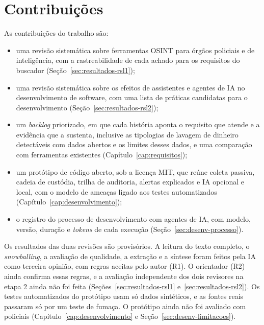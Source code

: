 \section{Contribuições}
\label{sec:intro-contribuicoes}

As contribuições do trabalho são:
\begin{itemize}
	\item uma revisão sistemática sobre ferramentas OSINT para órgãos policiais
	e de inteligência, com a rastreabilidade de cada achado para os requisitos
	do buscador (Seção~\ref{sec:resultados-rsl1});
	\item uma revisão sistemática sobre os efeitos de assistentes e agentes de
	IA no desenvolvimento de software, com uma lista de práticas candidatas
	para o desenvolvimento (Seção~\ref{sec:resultados-rsl2});
	\item um \textit{backlog} priorizado, em que cada história aponta o
	requisito que atende e a evidência que a sustenta, inclusive as
	tipologias de lavagem de dinheiro detectáveis com dados abertos e os
	limites desses dados, e uma comparação com ferramentas existentes
	(Capítulo~\ref{cap:requisitos});
	\item um protótipo de código aberto, sob a licença MIT, que reúne coleta
	passiva, cadeia de custódia, trilha de auditoria, alertas explicados e IA
	opcional e local, com o modelo de ameaças ligado aos testes automatizados
	(Capítulo~\ref{cap:desenvolvimento});
	\item o registro do processo de desenvolvimento com agentes de IA, com
	modelo, versão, duração e \textit{tokens} de cada execução
	(Seção~\ref{sec:desenv-processo}).
\end{itemize}

Os resultados das duas revisões são provisórios. A leitura do texto completo,
o \textit{snowballing}, a avaliação de qualidade, a extração e a síntese foram
feitos pela IA como terceira opinião, com regras aceitas pelo autor (R1). O
orientador (R2) ainda confirma essas regras, e a avaliação independente dos
dois revisores na etapa 2 ainda não foi feita
(Seções~\ref{sec:resultados-rsl1} e~\ref{sec:resultados-rsl2}). Os testes
automatizados do protótipo usam só dados sintéticos, e as fontes reais
passaram só por um teste de fumaça. O protótipo ainda não foi avaliado com
policiais
(Capítulo~\ref{cap:desenvolvimento} e Seção~\ref{sec:desenv-limitacoes}).

